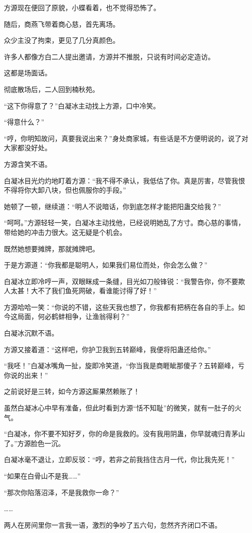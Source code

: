 \begin{this_body}
方源现在便回了原貌，小蝶看着，也不觉得恐怖了。

随后，商燕飞带着商心慈，首先离场。

众少主没了拘束，更见了几分真颜色。

许多人都像方白二人提出邀请，方源并不推脱，只说有时间必定造访。

这都是场面话。

彻底散场后，二人回到楠秋苑。

“这下你得意了？”白凝冰主动找上方源，口中冷笑。

“得意什么？”

“哼，你明知故问，真要我说出来？”身处商家城，有些话是不方便明说的，说了对大家都没好处。

方源含笑不语。

白凝冰目光灼灼地盯着方源：“我不得不承认，我低估了你。真是厉害，尽管我恨不得将你大卸八块，但也佩服你的手段。”

她顿了一顿，继续道：“明人不说暗话，你到底怎样才能把阳蛊交给我？”

“呵呵。”方源轻轻一笑，白凝冰主动找他，已经说明她乱了方寸。商心慈的事情，带给她的冲击力很大。这无疑是个机会。

既然她想要摊牌，那就摊牌吧。

于是方源道：“你我都是聪明人，如果我们易位而处，你会怎么做？”

白凝冰立即冷哼一声，双眼眯成一条缝，目光如刀般锋锐：“我警告你，你不要欺人太甚！大不了我们鱼死网破，看谁能讨得了好！”

方源哈哈一笑：“你说的不错，这些天我也想了，你我都有把柄在各自的手上。如今这局面，何必鹤蚌相争，让渔翁得利？”

白凝冰沉默不语。

方源又接着道：“这样吧，你护卫我到五转巅峰，我便将阳蛊还给你。”

“我呸！”白凝冰嘴角一扯，旋即冷笑道，“你当我是商睚眦那傻子？五转巅峰，亏你说的出来！”

之前说好是三转，如今方源这厮果然赖账了！

虽然白凝冰心中早有准备，但此时看到方源“恬不知耻”的微笑，就有一肚子的火气。

“白凝冰，你不要不知好歹，你的命是我救的。没有我用阴蛊，你早就魂归青茅山了。”方源脸色一沉。

白凝冰毫不退让，立即反驳：“哼，若非之前我挡住古月一代，你比我先死！”

“如果在白骨山不是我……”

“那次你陷落沼泽，不是我救你一命？”

……

两人在房间里你一言我一语，激烈的争吵了五六句，忽然齐齐闭口不语。


\end{this_body}
